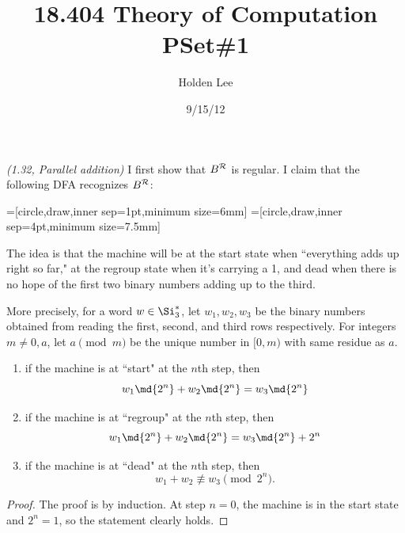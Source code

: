 \title{18.404 Theory of Computation PSet\#1}%
\author{Holden Lee}
\date{9/15/12}%
\maketitle
\begin{problem}{\it (1.32, Parallel addition)}
I first show that $B^{\cal R}$ is regular. I claim that the following DFA recognizes $B^{\cal R}$:

=[circle,draw,inner sep=1pt,minimum size=6mm]
=[circle,draw,inner sep=4pt,minimum size=7.5mm]
\begin{center}
\end{center}
The idea is that the machine will be at the start state when ``everything adds up right so far," at the regroup state when it's carrying a 1, and dead when there is no hope of the first two binary numbers adding up to the third.

More precisely, for a word $w\in \Si_3^*$, let $w_1,w_2,w_3$ be the binary numbers obtained from reading the first, second, and third rows respectively. For integers $m\ne 0, a$, let $a\pmod m$ be the unique number in $[0,m)$ with same residue as $a$. 
\begin{clm}
\begin{enumerate}
\item
if the machine is at ``start" at the $n$th step, then
\[
w_1\md{2^n}+w_2\md{2^n}=w_3\md{2^n}
\]
\item
if the machine is at ``regroup" at the $n$th step, then
\[
w_1\md{2^n}+w_2\md{2^n}=w_3\md{2^n}+2^n
\]
\item
if the machine is at ``dead" at the $n$th step, then
\[
w_1+w_2\nequiv w_3\pmod{2^n}.
\]
\end{enumerate}
\end{clm}
\begin{proof}
The proof is by induction. At step $n=0$, the machine is in the start state and $2^n=1$, so the statement clearly holds.


\end{proof}
\end{problem}
